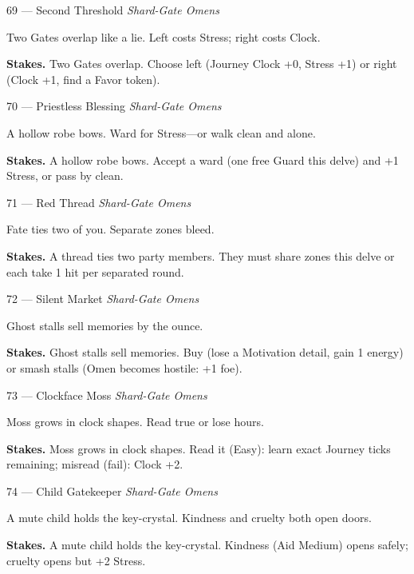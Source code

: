 \begin{encounterentry}{69 --- Second Threshold}
\textit{Shard-Gate Omens}

Two Gates overlap like a lie. Left costs Stress; right costs Clock.

\textbf{Stakes.} Two Gates overlap. Choose left (Journey Clock +0, Stress +1) or right (Clock +1, find a Favor token).
\end{encounterentry}

\begin{encounterentry}{70 --- Priestless Blessing}
\textit{Shard-Gate Omens}

A hollow robe bows. Ward for Stress---or walk clean and alone.

\textbf{Stakes.} A hollow robe bows. Accept a ward (one free Guard this delve) and +1 Stress, or pass by clean.
\end{encounterentry}

\begin{encounterentry}{71 --- Red Thread}
\textit{Shard-Gate Omens}

Fate ties two of you. Separate zones bleed.

\textbf{Stakes.} A thread ties two party members. They must share zones this delve or each take 1 hit per separated round.
\end{encounterentry}

\begin{encounterentry}{72 --- Silent Market}
\textit{Shard-Gate Omens}

Ghost stalls sell memories by the ounce.

\textbf{Stakes.} Ghost stalls sell memories. Buy (lose a Motivation detail, gain 1 energy) or smash stalls (Omen becomes hostile: +1 foe).
\end{encounterentry}

\begin{encounterentry}{73 --- Clockface Moss}
\textit{Shard-Gate Omens}

Moss grows in clock shapes. Read true or lose hours.

\textbf{Stakes.} Moss grows in clock shapes. Read it (Easy): learn exact Journey ticks remaining; misread (fail): Clock +2.
\end{encounterentry}

\begin{encounterentry}{74 --- Child Gatekeeper}
\textit{Shard-Gate Omens}

A mute child holds the key-crystal. Kindness and cruelty both open doors.

\textbf{Stakes.} A mute child holds the key-crystal. Kindness (Aid Medium) opens safely; cruelty opens but +2 Stress.
\end{encounterentry}

